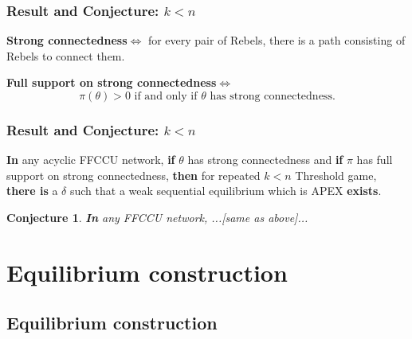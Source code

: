 \documentclass[10pt]{beamer}
\newtheorem{conjecture}{Conjecture}[section]
\begin{document}
\begin{frame}
  \frametitle{Result and Conjecture: $k<n$}


\begin{definition}
\textbf{Strong connectedness}$\Leftrightarrow$ for every pair of Rebels, there is a path consisting of Rebels to connect them.
\end{definition}  

\begin{definition}
\textbf{Full support on strong connectedness}$\Leftrightarrow$ 
\[\text{$\pi(\theta)>0$ if and only if $\theta$ has strong connectedness.}\]


\end{definition}  

\end{frame}





\begin{frame}
  \frametitle{Result and Conjecture: $k<n$}



\begin{theorem}
\label{thm_main_result}
\textbf{In} any {acyclic} FFCCU network, \textbf{if} {$\theta$ has strong connectedness} and \textbf{if} $\pi$ has full support  {on strong connectedness}, \textbf{then} for repeated $k<n$ Threshold game, \textbf{there is} a $\delta$ such that a {weak} sequential equilibrium which is APEX \textbf{exists}.
\end{theorem}

\begin{conjecture}
\textbf{In} any FFCCU network, ...[same as above]...
\end{conjecture}

\end{frame}

\section{Equilibrium construction}
\subsection{Equilibrium construction}
\end{document}
